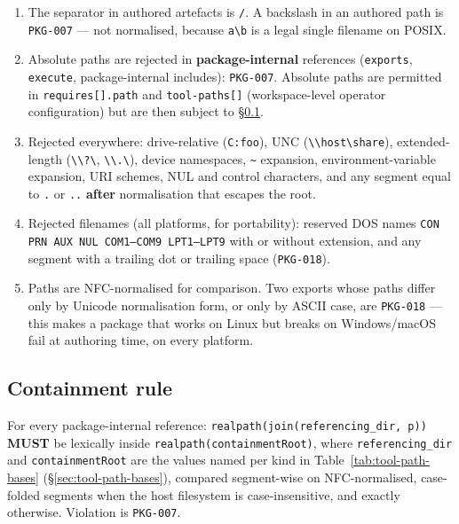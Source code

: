 \begin{enumerate}
  \item The separator in authored artefacts is \texttt{/}. A backslash in an
        authored path is \texttt{PKG-007} --- not normalised, because
        \texttt{a\textbackslash{}b} is a legal single filename on POSIX.
  \item Absolute paths are rejected in \textbf{package-internal} references
        (\texttt{exports}, \texttt{execute}, package-internal includes):
        \texttt{PKG-007}. Absolute paths are permitted in
        \texttt{requires[].path} and \texttt{tool-paths[]} (workspace-level
        operator configuration) but are then subject to \S\ref{sec:tool-path-containment}.
  \item Rejected everywhere: drive-relative (\texttt{C:foo}), UNC
        (\texttt{\textbackslash{}\textbackslash{}host\textbackslash{}share}),
        extended-length (\texttt{\textbackslash{}\textbackslash{}?\textbackslash{}},
        \texttt{\textbackslash{}\textbackslash{}.\textbackslash{}}), device
        namespaces, \texttt{\textasciitilde{}} expansion, environment-variable
        expansion, URI schemes, NUL and control characters, and any segment
        equal to \texttt{.} or \texttt{..} \textbf{after} normalisation that
        escapes the root.
  \item Rejected filenames (all platforms, for portability): reserved DOS
        names \texttt{CON PRN AUX NUL COM1--COM9 LPT1--LPT9} with or without
        extension, and any segment with a trailing dot or trailing space
        (\texttt{PKG-018}).
  \item Paths are NFC-normalised for comparison. Two exports whose paths
        differ only by Unicode normalisation form, or only by ASCII case,
        are \texttt{PKG-018} --- this makes a package that works on Linux
        but breaks on Windows/macOS fail at authoring time, on every
        platform.
\end{enumerate}

\subsection{Containment rule}
\label{sec:tool-path-containment}

For every package-internal reference: \texttt{realpath(join(referencing\_dir, p))}
\textbf{MUST} be lexically inside \texttt{realpath(containmentRoot)}, where
\texttt{referencing\_dir} and \texttt{containmentRoot} are the values named
per kind in Table~\ref{tab:tool-path-bases}
(\S\ref{sec:tool-path-bases}), compared segment-wise on NFC-normalised,
case-folded segments when the host filesystem is case-insensitive, and
exactly otherwise. Violation is \texttt{PKG-007}.

